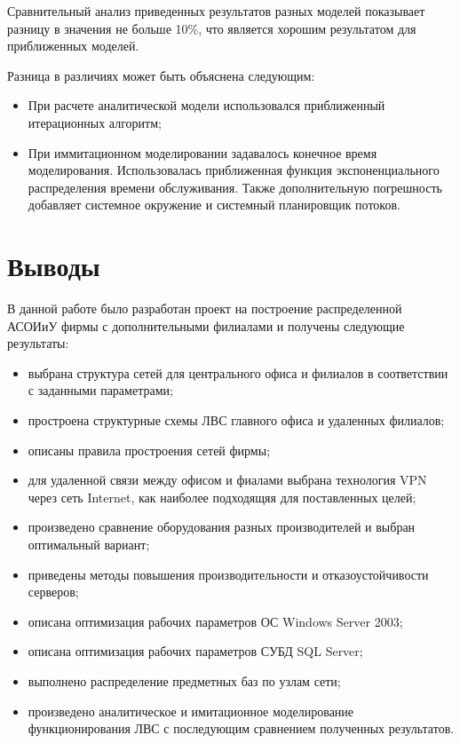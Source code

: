 \documentclass[russian,utf8,emptystyle]{eskdtext}
\begin{document}
Сравнительный анализ приведенных результатов разных моделей показывает разницу в значения не больше 10\%, что является хорошим результатом для приближенных моделей. 

Разница в различиях может быть объяснена следующим:
\begin{itemize}[label=-]
\item При расчете аналитической модели использовался приближенный итерационных алгоритм;
\item При иммитационном моделировании задавалось конечное время моделирования. Использовалась приближенная функция экспоненциального распределения времени обслуживания. Также дополнительную погрешность добавляет системное окружение и системный планировщик потоков.
\end{itemize}


\clearpage
\section{Выводы}

В данной работе было разработан проект на построение распределенной АСОИиУ фирмы с дополнительными филиалами и получены следующие результаты:
\begin{itemize}[label=-]
\item выбрана структура сетей для центрального офиса и филиалов в соответствии с заданными параметрами;
\item простроена структурные схемы ЛВС главного офиса и удаленных филиалов;
\item описаны правила простроения сетей фирмы;
\item для удаленной связи между офисом и фиалами выбрана технология VPN через сеть Internet, как наиболее подходящяя для поставленных целей;
\item произведено сравнение оборудования разных производителей и выбран оптимальный вариант;
\item приведены методы повышения производительности и отказоустойчивости серверов;
\item описана оптимизация рабочих параметров ОС Windows Server 2003;
\item описана оптимизация рабочих параметров СУБД SQL Server;
\item выполнено распределение предметных баз по узлам сети;
\item произведено аналитическое и имитационное моделирование функционирования ЛВС с последующим сравнением полученных результатов.
\end{itemize}
\end{document}
